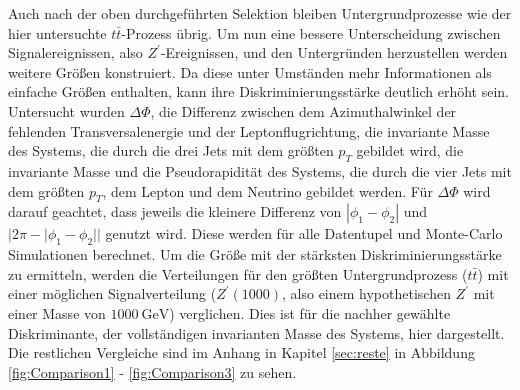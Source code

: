 Auch nach der oben durchgeführten Selektion bleiben Untergrundprozesse wie der hier untersuchte $t\bar{t}$-Prozess übrig.
Um nun eine bessere Unterscheidung zwischen Signalereignissen, also $Z^\prime$-Ereignissen, und den Untergründen herzustellen werden weitere Größen konstruiert.
Da diese unter Umständen mehr Informationen als einfache Größen enthalten, kann ihre Diskriminierungsstärke deutlich erhöht sein.
Untersucht wurden $\Delta\Phi$, die Differenz zwischen dem Azimuthalwinkel der fehlenden Transversalenergie und der Leptonflugrichtung, die invariante Masse des Systems, die durch die drei Jets mit dem größten $p_T$ gebildet wird, die invariante Masse und die Pseudorapidität des Systems, die durch die vier Jets mit dem größten $p_T$, dem Lepton und dem Neutrino gebildet werden.
Für $\Delta\Phi$ wird darauf geachtet, dass jeweils die kleinere Differenz von $|\phi_1 - \phi_2|$ und $|2\pi - |\phi_1 - \phi_2||$ genutzt wird.
Diese werden für alle Datentupel und Monte-Carlo Simulationen berechnet.
Um die Größe mit der stärksten Diskriminierungsstärke zu ermitteln, werden die Verteilungen für den größten Untergrundprozess ($t\bar{t}$) mit einer möglichen Signalverteilung ($Z^\prime(1000)$, also einem hypothetischen $Z^\prime$ mit einer Masse von $\SI{1000}{\giga\electronvolt}$) verglichen.
Dies ist für die nachher gewählte Diskriminante, der vollständigen invarianten Masse des Systems, hier dargestellt.
Die restlichen Vergleiche sind im Anhang in Kapitel \ref{sec:reste} in Abbildung \ref{fig:Comparison1} - \ref{fig:Comparison3} zu sehen.

